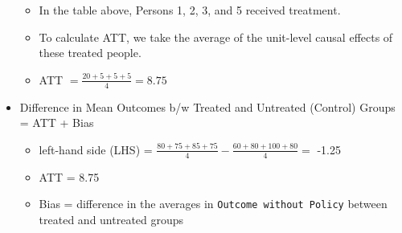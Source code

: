 \documentclass[]{book}
\providecommand{\tightlist}{%
  \setlength{\itemsep}{0pt}\setlength{\parskip}{0pt}}
\begin{document}
\begin{itemize}
  \begin{itemize}
  \tightlist
  \item
    In the table above, Persons 1, 2, 3, and 5 received treatment.
  \item
    To calculate ATT, we take the average of the unit-level causal effects of these treated people.
  \item
    ATT \(= \frac{20+5+5+5}{4} = 8.75\)
  \end{itemize}
\item
  Difference in Mean Outcomes b/w Treated and Untreated (Control) Groups = ATT + Bias

  \begin{itemize}
  \tightlist
  \item
    left-hand side (LHS) = \(\frac{80+75+85+75}{4}-\frac{60+80+100+80}{4} =\) -1.25
  \item
    ATT = 8.75
  \item
    Bias = difference in the averages in \texttt{Outcome\ without\ Policy} between treated and untreated groups


\end{itemize}
\end{itemize}
\end{document}
